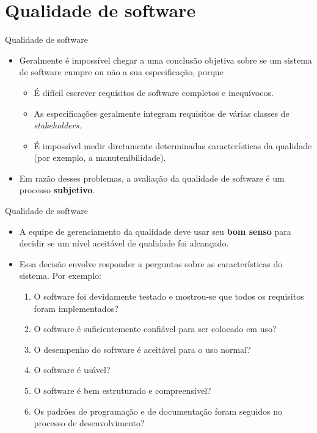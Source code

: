 \documentclass{beamer}
\begin{document}
\section{Qualidade de software}

\begin{frame}{Qualidade de software}
	\begin{itemize}
		\justifying
		\item Geralmente é impossível chegar a uma conclusão objetiva sobre se um sistema de software cumpre ou não a sua especificação, porque
		\begin{itemize}
			\justifying
			\item<1-3> É difícil escrever requisitos de software completos e inequívocos.
			\item<2-3> As especificações geralmente integram requisitos de várias classes de \textit{stakeholders}.
			\item<3> É impossível medir diretamente determinadas características da qualidade (por exemplo, a manutenibilidade).
		\end{itemize}
		\item<4> Em razão desses problemas, a avaliação da qualidade de software é um processo \textbf{subjetivo}.
	\end{itemize}
\end{frame}

\begin{frame}{Qualidade de software}
	\begin{itemize}
		\justifying
		\item A equipe de gerenciamento da qualidade deve usar seu \textbf{bom senso} para decidir se um nível aceitável de qualidade foi alcançado.
		\item Essa decisão envolve responder a perguntas sobre as características do sistema. Por exemplo:
		\begin{enumerate}
			\justifying
			\item<2-> O software foi devidamente testado e mostrou-se que todos os requisitos foram implementados?
			\item<3-> O software é suficientemente confiável para ser colocado em uso?
			\item<4-> O desempenho do software é aceitável para o uso normal?
			\item<5-> O software é usável?
			\item<6-> O software é bem estruturado e compreensível?
			\item<7> Os padrões de programação e de documentação foram seguidos no processo de desenvolvimento?
		\end{enumerate}
	\end{itemize}
\end{frame}
\end{document}
